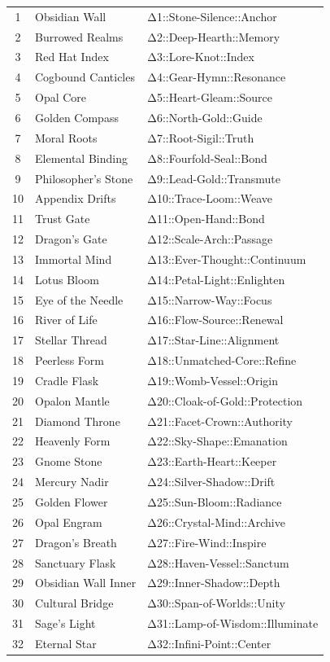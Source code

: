 \begin{longtable}{@{}|c|l|l|@{}}
1  & Obsidian Wall         & Δ1::Stone-Silence::Anchor \\
2  & Burrowed Realms       & Δ2::Deep-Hearth::Memory \\
3  & Red Hat Index         & Δ3::Lore-Knot::Index \\
4  & Cogbound Canticles    & Δ4::Gear-Hymn::Resonance \\
5  & Opal Core             & Δ5::Heart-Gleam::Source \\
6  & Golden Compass        & Δ6::North-Gold::Guide \\
7  & Moral Roots           & Δ7::Root-Sigil::Truth \\
8  & Elemental Binding     & Δ8::Fourfold-Seal::Bond \\
9  & Philosopher's Stone   & Δ9::Lead-Gold::Transmute \\
10 & Appendix Drifts       & Δ10::Trace-Loom::Weave \\
11 & Trust Gate            & Δ11::Open-Hand::Bond \\
12 & Dragon's Gate         & Δ12::Scale-Arch::Passage \\
13 & Immortal Mind         & Δ13::Ever-Thought::Continuum \\
14 & Lotus Bloom           & Δ14::Petal-Light::Enlighten \\
15 & Eye of the Needle     & Δ15::Narrow-Way::Focus \\
16 & River of Life         & Δ16::Flow-Source::Renewal \\
17 & Stellar Thread        & Δ17::Star-Line::Alignment \\
18 & Peerless Form         & Δ18::Unmatched-Core::Refine \\
19 & Cradle Flask          & Δ19::Womb-Vessel::Origin \\
20 & Opalon Mantle         & Δ20::Cloak-of-Gold::Protection \\
21 & Diamond Throne        & Δ21::Facet-Crown::Authority \\
22 & Heavenly Form         & Δ22::Sky-Shape::Emanation \\
23 & Gnome Stone           & Δ23::Earth-Heart::Keeper \\
24 & Mercury Nadir         & Δ24::Silver-Shadow::Drift \\
25 & Golden Flower         & Δ25::Sun-Bloom::Radiance \\
26 & Opal Engram           & Δ26::Crystal-Mind::Archive \\
27 & Dragon's Breath       & Δ27::Fire-Wind::Inspire \\
28 & Sanctuary Flask       & Δ28::Haven-Vessel::Sanctum \\
29 & Obsidian Wall Inner   & Δ29::Inner-Shadow::Depth \\
30 & Cultural Bridge       & Δ30::Span-of-Worlds::Unity \\
31 & Sage's Light          & Δ31::Lamp-of-Wisdom::Illuminate \\
32 & Eternal Star          & Δ32::Infini-Point::Center \\
\end{longtable}
\normalsize
